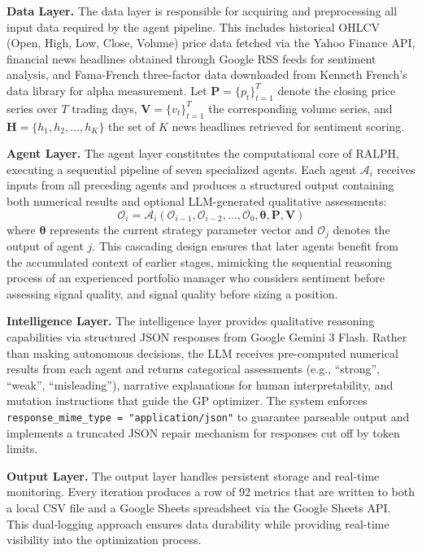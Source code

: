 \documentclass[conference]{IEEEtran}
\begin{document}
\textbf{Data Layer.} The data layer is responsible for acquiring and preprocessing all input data required by the agent pipeline. This includes historical OHLCV (Open, High, Low, Close, Volume) price data fetched via the Yahoo Finance API, financial news headlines obtained through Google RSS feeds for sentiment analysis, and Fama-French three-factor data downloaded from Kenneth French's data library for alpha measurement. Let $\mathbf{P} = \{p_t\}_{t=1}^{T}$ denote the closing price series over $T$ trading days, $\mathbf{V} = \{v_t\}_{t=1}^{T}$ the corresponding volume series, and $\mathbf{H} = \{h_1, h_2, \ldots, h_K\}$ the set of $K$ news headlines retrieved for sentiment scoring.

\textbf{Agent Layer.} The agent layer constitutes the computational core of RALPH, executing a sequential pipeline of seven specialized agents. Each agent $\mathcal{A}_i$ receives inputs from all preceding agents and produces a structured output containing both numerical results and optional LLM-generated qualitative assessments:
\begin{equation}
    \mathcal{O}_i = \mathcal{A}_i(\mathcal{O}_{i-1}, \mathcal{O}_{i-2}, \ldots, \mathcal{O}_0, \boldsymbol{\theta}, \mathbf{P}, \mathbf{V})
\end{equation}
where $\boldsymbol{\theta}$ represents the current strategy parameter vector and $\mathcal{O}_j$ denotes the output of agent $j$. This cascading design ensures that later agents benefit from the accumulated context of earlier stages, mimicking the sequential reasoning process of an experienced portfolio manager who considers sentiment before assessing signal quality, and signal quality before sizing a position.

\textbf{Intelligence Layer.} The intelligence layer provides qualitative reasoning capabilities via structured JSON responses from Google Gemini 3 Flash. Rather than making autonomous decisions, the LLM receives pre-computed numerical results from each agent and returns categorical assessments (e.g., ``strong'', ``weak'', ``misleading''), narrative explanations for human interpretability, and mutation instructions that guide the GP optimizer. The system enforces \texttt{response\_mime\_type = "application/json"} to guarantee parseable output and implements a truncated JSON repair mechanism for responses cut off by token limits.

\textbf{Output Layer.} The output layer handles persistent storage and real-time monitoring. Every iteration produces a row of 92 metrics that are written to both a local CSV file and a Google Sheets spreadsheet via the Google Sheets API. This dual-logging approach ensures data durability while providing real-time visibility into the optimization process.
\end{document}
